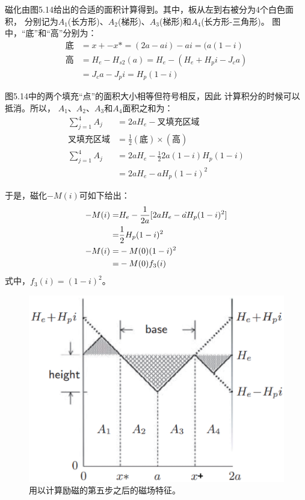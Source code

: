 磁化由图5.14给出的合适的面积计算得到。其中，板从左到右被分为4个白色面积，
分别记为$A_1$(长方形)、$A_2$(梯形)、$A_3$(梯形)和$A_4$(长方形-三角形)。
图中，“底”和“高”分别为：
\begin{align*}
\mbox{底}&=x+-x*=(2a-ai)-ai=(a(1-i)\\
\mbox{高}&=H_{e}-H_{s2}(a)=H_{e}-(H_{e}+H_{p}i-J_{c}a)\\
&=J_{c}a-J_{p}i=H_{p}(1-i)
\end{align*}

图5.14中的两个填充“点”的面积大小相等但符号相反，因此
计算积分的时候可以抵消。所以，
$A_1$、$A_2$、$A_3$和$A_4$面积之和为：
\begin{align*}
\sum_{j=1}^{4}A_{j}&=2aH_{e}-\mbox{叉填充区域}\\
\mbox{叉填充区域}&=\frac{1}{2}(\mbox{底})\times(\mbox{高})\\
\sum_{j=1}^{4}A_{j}&=2aH_{e}-\frac{1}{2}2a(1-i)H_{p}(1-i)\\
&=2aH_{e}-aH_{p}(1-i)^{2}
\end{align*}

于是，磁化$−M(i)$可如下给出：
\begin{subequations}
\begin{align}%
-M(i)=&H_{e}-\frac{1}{2a}[2aH_{e}-a \grave{}H_{p}(1-i)^{2}]\\\notag
=&\frac{1}{2}H_{p}(1-i)^{2}\\\notag
-M(i)=&-M(0)(1-i)^{2}\\
=&-M(0)f_{3}(i)
\end{align}
\end{subequations}
式中，$f_3(i) = (1 − i)^2$。

\begin{figure}[htbp]
	\centering
	\includegraphics[scale=0.5]{chpt5/figs/fig5.14.eps}
	\caption{用以计算励磁的第五步之后的磁场特征。}
\end{figure}

